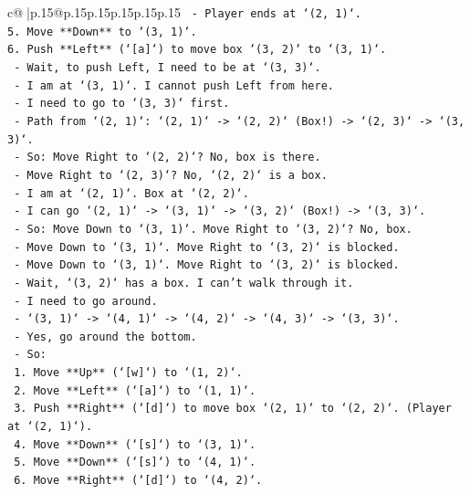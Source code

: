 \documentclass{article}
\begin{document}
{\begin{supertabular}{c@{$\;$}|p{.15\linewidth}@{}p{.15\linewidth}p{.15\linewidth}p{.15\linewidth}p{.15\linewidth}p{.15\linewidth}}
{{{\texttt{    {-}   Player ends at `(2, 1)`.} \\
\texttt{5.  Move **Down** to `(3, 1)`.} \\
\texttt{6.  Push **Left** (`{[}a{]}`) to move box `(3, 2)` to `(3, 1)`.} \\
\texttt{    {-}   Wait, to push Left, I need to be at `(3, 3)`.} \\
\texttt{    {-}   I am at `(3, 1)`. I cannot push Left from here.} \\
\texttt{    {-}   I need to go to `(3, 3)` first.} \\
\texttt{    {-}   Path from `(2, 1)`: `(2, 1)` {-}> `(2, 2)` (Box!) {-}> `(2, 3)` {-}> `(3, 3)`.} \\
\texttt{    {-}   So: Move Right to `(2, 2)`? No, box is there.} \\
\texttt{    {-}   Move Right to `(2, 3)`? No, `(2, 2)` is a box.} \\
\texttt{    {-}   I am at `(2, 1)`. Box at `(2, 2)`.} \\
\texttt{    {-}   I can go `(2, 1)` {-}> `(3, 1)` {-}> `(3, 2)` (Box!) {-}> `(3, 3)`.} \\
\texttt{    {-}   So: Move Down to `(3, 1)`. Move Right to `(3, 2)`? No, box.} \\
\texttt{    {-}   Move Down to `(3, 1)`. Move Right to `(3, 2)` is blocked.} \\
\texttt{    {-}   Move Down to `(3, 1)`. Move Right to `(3, 2)` is blocked.} \\
\texttt{    {-}   Wait, `(3, 2)` has a box. I can't walk through it.} \\
\texttt{    {-}   I need to go around.} \\
\texttt{    {-}   `(3, 1)` {-}> `(4, 1)` {-}> `(4, 2)` {-}> `(4, 3)` {-}> `(3, 3)`.} \\
\texttt{    {-}   Yes, go around the bottom.} \\
\texttt{    {-}   So:} \\
\texttt{        1.  Move **Up** (`{[}w{]}`) to `(1, 2)`.} \\
\texttt{        2.  Move **Left** (`{[}a{]}`) to `(1, 1)`.} \\
\texttt{        3.  Push **Right** (`{[}d{]}`) to move box `(2, 1)` to `(2, 2)`. (Player at `(2, 1)`).} \\
\texttt{        4.  Move **Down** (`{[}s{]}`) to `(3, 1)`.} \\
\texttt{        5.  Move **Down** (`{[}s{]}`) to `(4, 1)`.} \\
\texttt{        6.  Move **Right** (`{[}d{]}`) to `(4, 2)`.} \\
}}}
\end{supertabular}}
\end{document}
